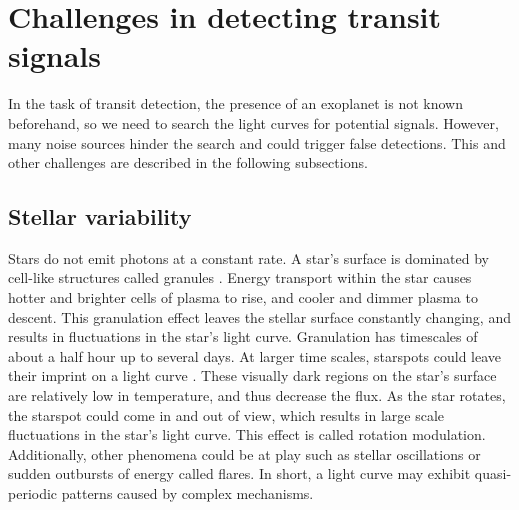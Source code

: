 
\section{Challenges in detecting transit signals}
\label{sec:challenges}

In the task of transit detection, the presence of an exoplanet is not known beforehand, 
so we need to search the light curves for potential signals. However, many noise sources hinder the search and could trigger false detections. This and other challenges are described in the following subsections.

\subsection{Stellar variability}
Stars do not emit photons at a constant rate. A star's surface is dominated by cell-like structures called granules \citep{kallinger2014connection}. Energy transport within the star causes hotter and brighter cells of plasma to rise, and cooler and dimmer plasma to descent. This granulation effect leaves the stellar surface constantly changing, and results in fluctuations in the star’s light curve. Granulation has timescales of about a half hour up to several days. At larger time scales, starspots could leave their imprint on a light curve \citep{strassmeier2009starspots}. These visually dark regions on the star's surface are relatively low in temperature, and thus decrease the flux. As the star rotates, the starspot could come in and out of view, which results in large scale fluctuations in the star’s light curve. This effect is called rotation modulation. Additionally, other phenomena could be at play such as stellar oscillations or sudden outbursts of energy called flares. In short, a light curve may exhibit quasi-periodic patterns caused by complex mechanisms.


